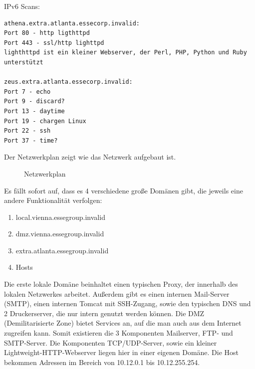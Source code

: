 IPv6 Scans:
\begin{lstlisting}
athena.extra.atlanta.essecorp.invalid:
Port 80 - http ligthttpd
Port 443 - ssl/http lighttpd
lighthttpd ist ein kleiner Webserver, der Perl, PHP, Python und Ruby unterstützt

zeus.extra.atlanta.essecorp.invalid:
Port 7 - echo
Port 9 - discard?
Port 13 - daytime
Port 19 - chargen Linux
Port 22 - ssh
Port 37 - time?
\end{lstlisting}

Der Netzwerkplan zeigt wie das Netzwerk aufgebaut ist.

\begin{figure}[h!]
  \centering
  \caption{Netzwerkplan}
  \label{fig:netzwerkplan}
\end{figure}

Es fällt sofort auf, dass es 4 verschiedene große Domänen gibt, die jeweils eine andere Funktionalität verfolgen:
\begin{enumerate}
\item local.vienna.essegroup.invalid
\item dmz.vienna.essegroup.invalid
\item extra.atlanta.essegroup.invalid
\item Hosts
\end{enumerate}

Die erste lokale Domäne beinhaltet einen typischen Proxy, der innerhalb des lokalen Netzwerkes arbeitet. Außerdem gibt es einen
internen Mail-Server (SMTP), einen internen Tomcat mit SSH-Zugang, sowie den typischen DNS und 2 Druckerserver, die
nur intern genutzt werden können.\linebreak
Die DMZ (Demilitarisierte Zone) bietet Services an, auf die man auch aus dem Internet zugreifen kann. Somit existieren die
3 Komponenten Mailserver, FTP- und SMTP-Server.\linebreak
Die Komponenten TCP/UDP-Server, sowie ein kleiner Lightweight-HTTP-Webserver liegen hier in einer eigenen Domäne.\linebreak
Die Host bekommen Adressen im Bereich von 10.12.0.1 bis 10.12.255.254.
